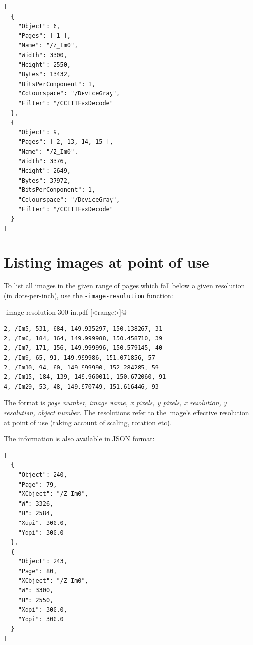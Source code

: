 \documentclass{book}
\begin{document}
  \begin{framed}
{\small\begin{verbatim}[
  {
    "Object": 6,
    "Pages": [ 1 ],
    "Name": "/Z_Im0",
    "Width": 3300,
    "Height": 2550,
    "Bytes": 13432,
    "BitsPerComponent": 1,
    "Colourspace": "/DeviceGray",
    "Filter": "/CCITTFaxDecode"
  },
  {
    "Object": 9,
    "Pages": [ 2, 13, 14, 15 ],
    "Name": "/Z_Im0",
    "Width": 3376,
    "Height": 2649,
    "Bytes": 37972,
    "BitsPerComponent": 1,
    "Colourspace": "/DeviceGray",
    "Filter": "/CCITTFaxDecode"
  }
]\end{verbatim}}
  \end{framed}

  \section{Listing images at point of use}\label{imageres}
  To list all images in the given range of pages which fall below a given resolution (in dots-per-inch), use the \verb!-image-resolution! function:
  \begin{framed}
  \noindent\small\verb@cpdf -image-resolution 300 in.pdf [<range>]@
  \end{framed}

  \begin{framed}
{\small\begin{verbatim}2, /Im5, 531, 684, 149.935297, 150.138267, 31
2, /Im6, 184, 164, 149.999988, 150.458710, 39
2, /Im7, 171, 156, 149.999996, 150.579145, 40
2, /Im9, 65, 91, 149.999986, 151.071856, 57
2, /Im10, 94, 60, 149.999990, 152.284285, 59
2, /Im15, 184, 139, 149.960011, 150.672060, 91
4, /Im29, 53, 48, 149.970749, 151.616446, 93\end{verbatim}}
  \end{framed}
  \noindent The format is \textit{page number, image name, x pixels, y pixels, x resolution, y resolution, object number}. The resolutions refer to the image's effective resolution at point of use (taking account 
of scaling, rotation etc).

The information is also available in JSON format:
\begin{framed}
{\small\begin{verbatim}
[
  {
    "Object": 240,
    "Page": 79,
    "XObject": "/Z_Im0",
    "W": 3326,
    "H": 2584,
    "Xdpi": 300.0,
    "Ydpi": 300.0
  },
  {
    "Object": 243,
    "Page": 80,
    "XObject": "/Z_Im0",
    "W": 3300,
    "H": 2550,
    "Xdpi": 300.0,
    "Ydpi": 300.0
  }
]
\end{verbatim}}
  \end{framed}
\end{document}

